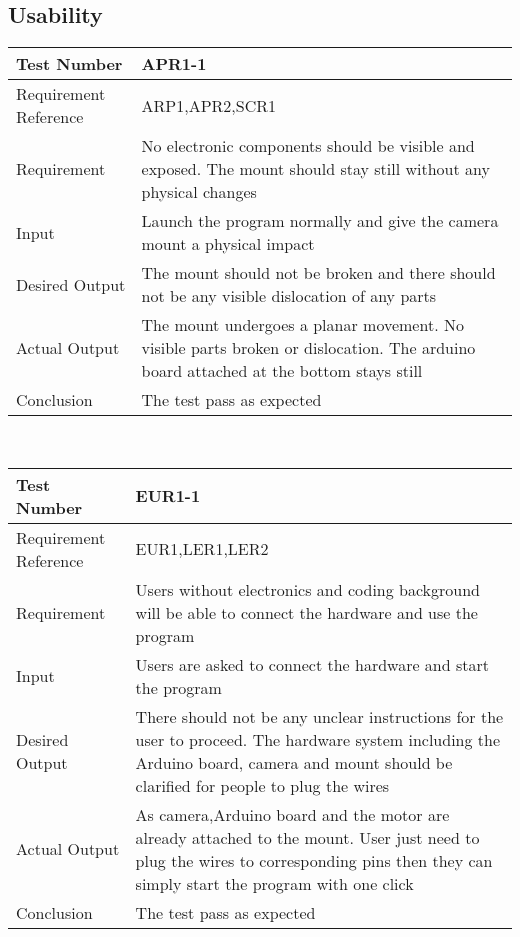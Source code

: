 \documentclass[12pt, titlepage]{article}
\begin{document}
\subsection{Usability}
\begin{table}[H]
\begin{center}
\begin{tabular}{|p{} | p{}|}
\hline
  Test Number &  APR1-1 \\
  \hline
  Requirement Reference & ARP1,APR2,SCR1 \\
  \hline
  Requirement & No electronic components should be visible and exposed. The mount should stay still without any physical changes  \\
  \hline
  Input & Launch the program normally and give the camera mount a physical impact \\
  \hline
  Desired Output & The mount should not be broken and there should not be any visible dislocation of any parts\\
  \hline
  Actual Output & The mount undergoes a planar movement. No visible parts broken or dislocation. The arduino board attached at the bottom stays still  \\
  \hline
  Conclusion & The test pass as expected\\
  \hline
\end{tabular}
\end{center}           
\end{table}
\\
\begin{table}[H]
\begin{center}
\begin{tabular}{|p{} | p{}|}
\hline
  Test Number & EUR1-1\\
  \hline
  Requirement Reference & EUR1,LER1,LER2\\
  \hline
  Requirement &  Users without electronics and coding background will be able to connect the hardware and use the program\\
  \hline
  Input & Users are asked to connect the hardware and start the program\\
  \hline
  Desired Output & There should not be any unclear instructions for the user to proceed. The hardware system including the Arduino board, camera and mount should be clarified for people to plug the wires\\
  \hline
  Actual Output & As camera,Arduino board and the motor are already attached to the mount. User just need to plug the wires to corresponding pins then they can simply start the program with one click \\
  \hline
  Conclusion & The test pass as expected\\
  \hline
\end{tabular}
\end{center}           
\end{table}
\end{document}
